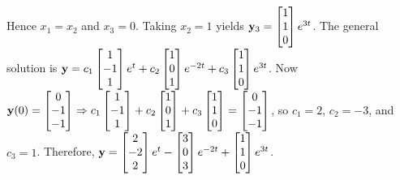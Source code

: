 \documentclass{ximera}
\begin{document}
\begin{problem}
\begin{solution}
Hence  $x_1=x_2$ and $x_3=0$.  Taking $x_2=1$ yields
${\bf y}_3=  \begin{bmatrix}1\\1\\0
 \end{bmatrix}e^{3t}$.
The general solution is
${\bf y}=c_1  \begin{bmatrix}1\\-1\\1
 \end{bmatrix}e^t+
c_2  \begin{bmatrix}1\\0\\1
 \end{bmatrix}e^{-2t}
+c_3  \begin{bmatrix}1\\1\\0
 \end{bmatrix}e^{3t}$.
Now ${\bf y}(0)=  \begin{bmatrix}0\\-1\\-1\end{bmatrix}\Rightarrow
c_1  \begin{bmatrix}1\\-1\\1
 \end{bmatrix}+
c_2  \begin{bmatrix}1\\0\\1
 \end{bmatrix}
+c_3  \begin{bmatrix}1\\1\\0
 \end{bmatrix}=  \begin{bmatrix}0\\-1\\-1\end{bmatrix}$, so
$c_1=2$, $c_2=-3$, and $c_3=1$. Therefore,
${\bf
y}=  \begin{bmatrix}2\\-2\\2\end{bmatrix}e^t- \begin{bmatrix}3\\0\\3\end{bmatrix}e^{-2t}+ \begin{bmatrix}1\\1\\0\end{bmatrix}e^{3t}$.
\end{solution}
\end{problem}
\end{document}
